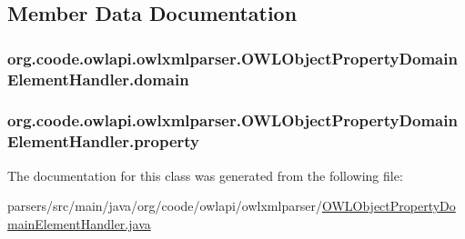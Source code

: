 \subsection{Member Data Documentation}
\hypertarget{classorg_1_1coode_1_1owlapi_1_1owlxmlparser_1_1_o_w_l_object_property_domain_element_handler_a28459fa7df6f3126d5666ee4f2756dd3}{
\subsubsection[{domain}]{ org.\-coode.\-owlapi.\-owlxmlparser.\-O\-W\-L\-Object\-Property\-Domain\-Element\-Handler.\-domain\hspace{0.3cm}{\ttfamily [private]}}}\label{classorg_1_1coode_1_1owlapi_1_1owlxmlparser_1_1_o_w_l_object_property_domain_element_handler_a28459fa7df6f3126d5666ee4f2756dd3}
\hypertarget{classorg_1_1coode_1_1owlapi_1_1owlxmlparser_1_1_o_w_l_object_property_domain_element_handler_a63cd23fe25bf4daf7a12b248def37536}{
\subsubsection[{property}]{ org.\-coode.\-owlapi.\-owlxmlparser.\-O\-W\-L\-Object\-Property\-Domain\-Element\-Handler.\-property\hspace{0.3cm}{\ttfamily [private]}}}\label{classorg_1_1coode_1_1owlapi_1_1owlxmlparser_1_1_o_w_l_object_property_domain_element_handler_a63cd23fe25bf4daf7a12b248def37536}


The documentation for this class was generated from the following file\-:\begin{DoxyCompactItemize}
\item 
parsers/src/main/java/org/coode/owlapi/owlxmlparser/\hyperlink{_o_w_l_object_property_domain_element_handler_8java}{O\-W\-L\-Object\-Property\-Domain\-Element\-Handler.\-java}\end{DoxyCompactItemize}
